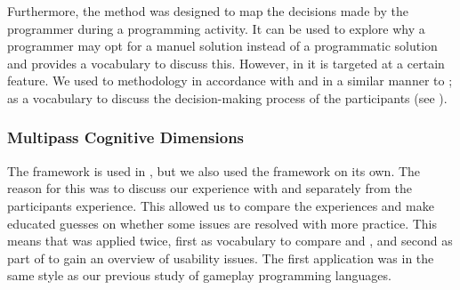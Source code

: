 Furthermore, the \attention method was designed to map the decisions made by the programmer during a programming activity. It can be used to explore why a programmer may opt for a manuel solution instead of a programmatic solution and provides a vocabulary to discuss this. However, in \champagne it is targeted at a certain feature. We used to methodology in accordance with \champagne and in a similar manner to \cognitive; as a vocabulary to discuss the decision-making  process of the participants (see ).

\subsubsection{Multipass Cognitive Dimensions}
The \cognitive framework is used in \champagne, but we also used the framework on its own. The reason for this was to discuss our experience with \fs and \cs separately from the participants experience. This allowed us to compare the experiences and make educated guesses on whether some issues are resolved with more practice. This means that \cognitive was applied twice, first as vocabulary to compare \cs and \fs, and second as part of \champagne to gain an overview of usability issues. The first application was in the same style as our previous study of gameplay programming languages\cite{p92018gameplay}.
